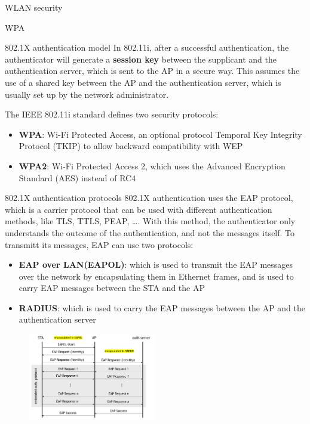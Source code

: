 \begin{section}{WLAN security}
\begin{subsection}{WPA}
\begin{subsubsection}{802.1X authentication model}
      In 802.11i, after a successful authentication, the authenticator will generate a \textbf{session
      key} between the supplicant and the authentication server, which is sent to the AP in a secure 
      way. This assumes the use of a shared key between the AP and the authentication server, which is 
      usually set up by the network administrator.\\
    \end{subsubsection}
    The IEEE 802.11i standard defines two security protocols:
    \begin{itemize}
      \item \textbf{WPA}: Wi-Fi Protected Access, an optional protocol Temporal Key Integrity 
        Protocol (TKIP) to allow backward compatibility with WEP
      \item \textbf{WPA2}: Wi-Fi Protected Access 2, which uses the Advanced Encryption Standard 
        (AES) instead of RC4
    \end{itemize}
    \begin{subsubsection}{802.1X authentication protocols}
      802.1X authentication uses the EAP protocol, which is a carrier protocol that can be used with
      different authentication methods, like TLS, TTLS, PEAP, \dots. With this method, the
      authenticator only understands the outcome of the authentication, and not the messages itself.
      To transmitt its messages, EAP can use two protocols:
      \begin{itemize}
        \item \textbf{EAP over LAN(EAPOL)}: which is used to transmit the EAP messages over the 
          network by encapsulating them in Ethernet frames, and is used to carry EAP messages between
          the STA and the AP
        \item \textbf{RADIUS}: which is used to carry the EAP messages between the AP and the 
          authentication server
      \end{itemize}
      \begin{figure}[h]
        \centering
        \includegraphics[width=0.5\textwidth]{img/wireless/EAP authentication.png}

\end{figure}
\end{subsubsection}
\end{subsection}
\end{section}
